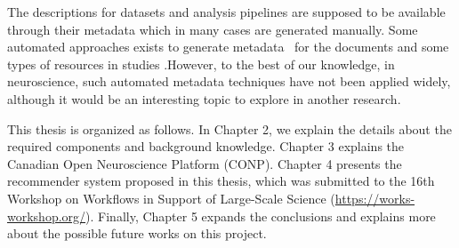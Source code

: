 The descriptions for datasets and analysis pipelines are supposed to be available through their metadata which in many cases are generated manually. Some automated approaches exists to generate metadata~\cite{liddy2002automatic} for the documents and some types of resources in studies .However, to the best of our knowledge, in neuroscience, such automated metadata techniques have not been applied  widely, although it would be an interesting topic to explore in another research.



This thesis is organized as follows. In Chapter 2, we explain the details about the required components and background knowledge. Chapter 3 explains the Canadian Open Neuroscience Platform (CONP). Chapter 4 presents the recommender system proposed in this thesis, which was submitted to the 16th Workshop on Workflows in Support of Large-Scale Science (\url{https://works-workshop.org/}). Finally, Chapter 5 expands the conclusions and explains more about the possible future works on this project.




